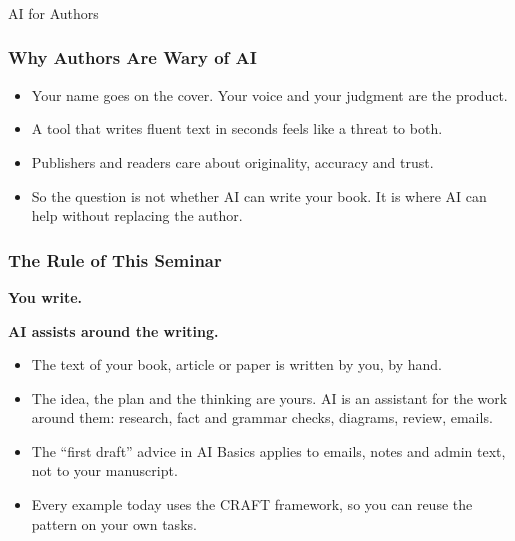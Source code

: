 
\begin{frame}[fragile]\frametitle{}
\begin{center}
{\Large AI for Authors}
\end{center}
\end{frame}

\begin{frame}[fragile]\frametitle{Why Authors Are Wary of AI}
\begin{itemize}
\item Your name goes on the cover. Your voice and your judgment are the product.
\item A tool that writes fluent text in seconds feels like a threat to both.
\item Publishers and readers care about originality, accuracy and trust.
\item So the question is not whether AI can write your book. It is where AI can help without replacing the author.
\end{itemize}
\end{frame}

\begin{frame}[fragile]\frametitle{The Rule of This Seminar}
\begin{center}
\Large
\textbf{You write.}

\medskip
\textbf{AI assists around the writing.}
\end{center}

\medskip
\begin{itemize}
\item The text of your book, article or paper is written by you, by hand.
\item The idea, the plan and the thinking are yours. AI is an assistant for the work around them: research, fact and grammar checks, diagrams, review, emails.
\item The ``first draft'' advice in AI Basics applies to emails, notes and admin text, not to your manuscript.
\item Every example today uses the CRAFT framework, so you can reuse the pattern on your own tasks.
\end{itemize}
\end{frame}

